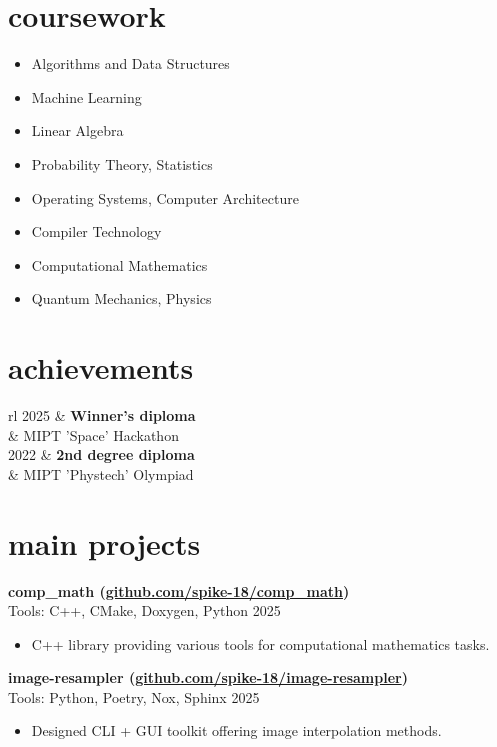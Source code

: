 \documentclass[12pt]{article}
\newcommand{\entry}[4]{{{\textbf{#1}}} \hfill #3 \\ #2 \hfill #4}
\newcommand{\tableentry}[3]{\textsc{#1} & #2\expandafter\ifstrequal\expandafter{#3}{}{\\}{\\[6pt]}}
\begin{document}
\begin{paracol}{2}
		\section{coursework}
		\begin{itemize}[noitemsep,leftmargin=3.5mm,rightmargin=0mm,topsep=2pt]
			\item Algorithms and Data Structures
			\item Machine Learning
			\item Linear Algebra
			\item Probability Theory, Statistics
			\item Operating Systems, Computer Architecture
			\item Compiler Technology
			\item Computational Mathematics
			\item Quantum Mechanics, Physics
		\end{itemize}
		
		\section{achievements}
		\begin{supertabular}{rl}
			\tableentry{2025}{\textbf{Winner's diploma}}{}
			\tableentry{}{MIPT 'Space' Hackathon}{spaceafter}
			\tableentry{2022}{\textbf{2nd degree diploma}}{}
			\tableentry{}{MIPT 'Phystech' Olympiad}{}
		\end{supertabular}		
		
		\switchcolumn
		

		
		\section{main projects}
		
				
		\entry{comp\_math \normalfont \footnotesize{(\href{https://github.com/spike-18/comp_math}{github.com/spike-18/comp\_math})}}{Tools: C++, CMake, Doxygen, Python}{ }{2025}
		\begin{itemize}[noitemsep,leftmargin=3.5mm,rightmargin=0mm,topsep=6pt]
			\item C++ library providing various tools for computational mathematics tasks.
		\end{itemize}

		\entry{image-resampler \normalfont \footnotesize{(\href{https://github.com/spike-18/image-resampler}{github.com/spike-18/image-resampler})}}{Tools: Python, Poetry, Nox, Sphinx}{ }{2025}
		\begin{itemize}[noitemsep,leftmargin=3.5mm,rightmargin=0mm,topsep=6pt]
			\item Designed CLI + GUI toolkit offering image interpolation methods.
		\end{itemize}


\end{paracol}
\end{document}
